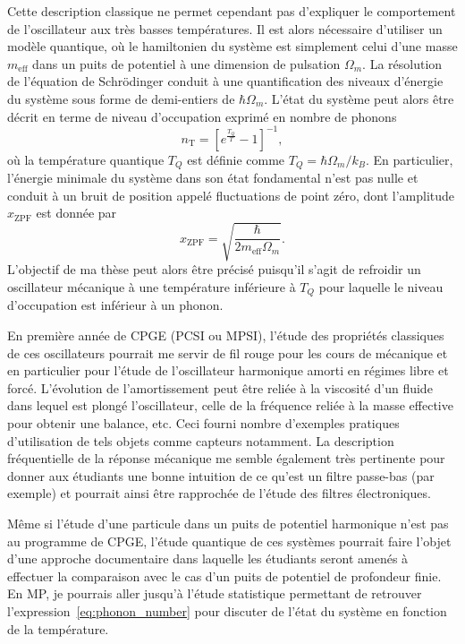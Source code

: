 \documentclass[12pt,a4paper]{article}
\newenvironment{mep}{%
\addcontentsline{ldf}{figure}{0}%
\begin{mep_env}
\small}
{\end{mep_env}}
\begin{document}
Cette description classique ne permet cependant pas d'expliquer le comportement de l'oscillateur aux très basses températures.
Il est alors nécessaire d'utiliser un modèle quantique, où le hamiltonien du système est simplement celui d'une masse $m_\mathrm{eff}$ dans un puits de potentiel à une dimension de pulsation $\Omega_m$.
La résolution de l'équation de Schrödinger conduit à une quantification des niveaux d'énergie du système sous forme de demi-entiers de $\hbar\Omega_m$.
L'état du système peut alors être décrit en terme de niveau d'occupation exprimé en nombre de phonons
\begin{equation}
n_\mathrm{T} = \left[ e^\frac{T_Q}{T} -1\right]^{-1},
\label{eq:phonon_number}
\end{equation}
où la température quantique $T_Q$ est définie comme $T_Q = \hbar\Omega_m/k_B$.
En particulier, l'énergie minimale du système dans son état fondamental n'est pas nulle et conduit à un bruit de position appelé fluctuations de point zéro, dont l'amplitude $x_\mathrm{ZPF}$ est donnée par
\begin{equation}
x_\mathrm{ZPF}=\sqrt{\frac{\hbar}{2m_\mathrm{eff}\Omega_m}}.
\end{equation}
L'objectif de ma thèse peut alors être précisé puisqu'il s'agit de refroidir un oscillateur mécanique à une température inférieure à $T_Q$ pour laquelle le niveau d'occupation est inférieur à un phonon.

\begin{mep}
En première année de CPGE (PCSI ou MPSI), l'étude des propriétés classiques de ces oscillateurs pourrait me servir de fil rouge pour les cours de mécanique et en particulier pour l'étude de l'oscillateur harmonique amorti en régimes libre et forcé.
L'évolution de l'amortissement peut être reliée à la viscosité d'un fluide dans lequel est plongé l'oscillateur, celle de la fréquence reliée à la masse effective pour obtenir une balance, etc.
Ceci fourni nombre d'exemples pratiques d'utilisation de tels objets comme capteurs notamment.
La description fréquentielle de la réponse mécanique me semble également très pertinente pour donner aux étudiants une bonne intuition de ce qu'est un filtre passe-bas (par exemple) et pourrait ainsi être rapprochée de l'étude des filtres électroniques.

\noindent
Même si l'étude d'une particule dans un puits de potentiel harmonique n'est pas au programme de CPGE, l'étude quantique de ces systèmes pourrait faire l'objet d'une approche documentaire dans laquelle les étudiants seront amenés à effectuer la comparaison avec le cas d'un puits de potentiel de profondeur finie.
En MP, je pourrais aller jusqu'à l'étude statistique permettant de retrouver l'expression~\ref{eq:phonon_number} pour discuter de l'état du système en fonction de la température.
\end{mep}
\end{document}
